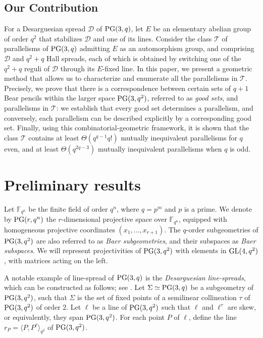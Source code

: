 \documentclass[11pt]{article}
\theoremstyle{definition}
\numberwithin{equation}{section}
\def\cD{\mathcal D}
\def\cT{\mathcal T}
\def\PG{{\rm PG}}
\def\F{{\mathbb F}}
\def\GL{{\rm GL}}
\begin{document}
\subsection{Our Contribution}
For a Desarguesian spread $\cD$ of $\PG(3,q)$, let $E$ be an elementary abelian group of order $q^2$ that stabilizes $\cD$ and one of its lines. Consider the class $\cT$ of parallelisms of $\PG(3, q)$ admitting $E$ as an automorphism group, and comprising $\cD$ and $q^2+q$ Hall spreads, each of which is obtained by switching one of the $q^2+q$ reguli of $\cD$ through its $E$-fixed line. In this paper, we present a geometric method that allows us to characterize and enumerate all the parallelisms in $\cT$. Precisely, we prove that there is a correspondence between certain sets of $q+1$ Bear pencils within the larger space $\PG(3,q^2)$, referred to as \emph{good sets}, and parallelisms in $\cT$: we establish that every good set determines a parallelism, and conversely, each parallelism can be described explicitly by a corresponding good set.
Finally, using this combinatorial-geometric framework, it is shown that the class $\cT$ contains at least $\Theta(q^{q-1} q!)$ mutually inequivalent parallelisms for $q$ even, and at least $\Theta(q^{2q-3})$ mutually inequivalent parallelisms when $q$ is odd.


\section{Preliminary results}

Let $\F_{q^n}$ be the finite field of order $q^n$, where $q = p^m$ and $p$ is a prime. We denote by $\PG(r, q^n)$ the $r$-dimensional projective space over $\F_{q^n}$, equipped with homogeneous projective coordinates $(x_1, \dots, x_{r+1})$. The $q$-order subgeometries of $\PG(3,q^2)$ are also referred to as \emph{Baer subgeometries}, and their subspaces as \emph{Baer subspaces}.
We will represent projectivities of $\PG(3, q^2)$ with elements in $\GL(4, q^2)$, with matrices acting on the left.

A notable example of line-spread of $\PG(3, q)$ is the {\em Desarguesian line-spreads}, which can be constructed as follows; see \cite{segre1964teoria}. Let $\Sigma \simeq \PG(3,q)$ be a subgeometry of $ \PG(3,q^2)$, such that $\Sigma$ is the set of fixed points of a semilinear collineation $\tau$ of $\PG(3,q^2)$ of order $2$. Let $\ell$ be a line of $\PG(3,q^2)$ such that $\ell$ and $\ell^{\tau}$ are skew, or equivalently, they span $\PG(3,q^2)$. For each point $P$ of $\ell$, define the line $r_P=\langle P,P^{\tau}\rangle_{q^2}$ of $\PG(3,q^2)$. 
\end{document}
